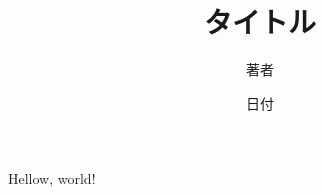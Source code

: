 \documentclass[a4j]{jsarticle}
\title{タイトル}
\author{著者}
\date{日付}
\begin{document}
\maketitle
Hellow, world!
\end{document}
